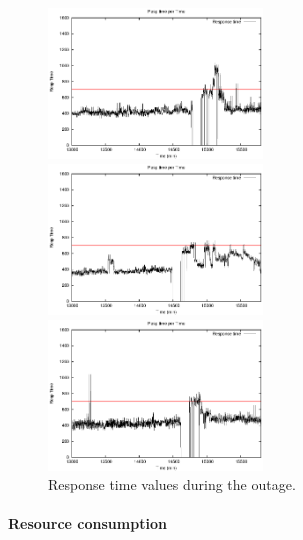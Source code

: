 \begin{figure}[htb]
	\begin{minipage}[b]{0.32\linewidth}
		\includegraphics[height=4cm]{images/exps2011/low/ec2/proxyDataPoints_output_filtered.eps}	
		\vspace{-4mm}
	\end{minipage}
	\hfill
	\begin{minipage}[b]{0.32\linewidth}
		\includegraphics[height=4cm]{images/exps2011/medium/ec2/proxyDataPoints_output_filtered.eps}
		\vspace{-4mm}
	\end{minipage}
\hfill
\begin{minipage}[b]{0.32\linewidth}
		\includegraphics[height=4cm]{images/exps2011/high/ec2/proxyDataPoints_output_filtered.eps}
		\vspace{-4mm}
	\end{minipage}
\caption{Response time values during the outage.}
\label{fig:EC2ResponseTime}
\end{figure}

\paragraph{Resource consumption}


